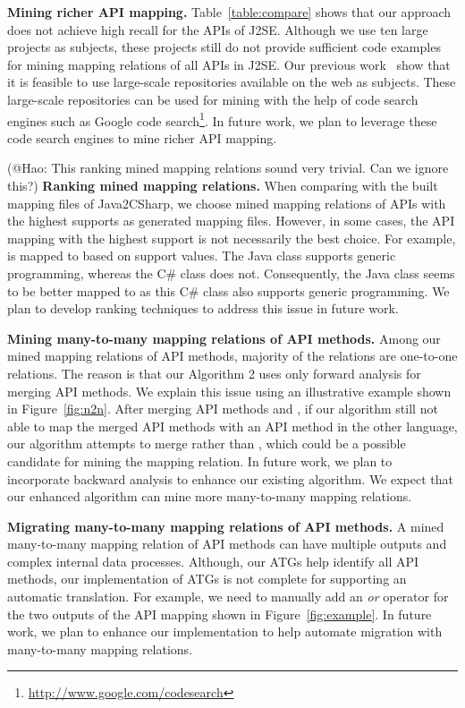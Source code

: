 \textbf{Mining richer API mapping.} Table~\ref{table:compare} shows
that our approach does not achieve high recall for the APIs of J2SE. Although
we use ten large projects as subjects, these projects still do not provide
sufficient code examples for mining mapping relations of all APIs in J2SE.
Our previous work~\cite{thummalapenta07parseweb,thummalapentaase08spotweb} show
that it is feasible to use large-scale repositories available on the web as subjects.
These large-scale repositories can be used for mining with the help of code search engines such
as Google code search\footnote{\url{http://www.google.com/codesearch}}. In future
work, we plan to leverage these code search engines to mine richer API mapping.

(@Hao: This ranking mined mapping relations sound very trivial. Can we ignore this?)
\textbf{Ranking mined mapping relations.} When comparing with the
built mapping files of Java2CSharp, we choose mined mapping
relations of APIs with the highest supports as generated mapping
files. However, in some cases, the API mapping with the highest
support is not necessarily the best choice. For example,
 is mapped to
 based on support values. The
Java class supports generic programming, whereas the C\# class does
not. Consequently, the Java class seems to be better mapped to
 as this C\# class also
supports generic programming. We plan to develop ranking techniques
to address this issue in future work.

\textbf{Mining many-to-many mapping relations of API methods.}
Among our mined mapping relations of API methods, majority of
the relations are one-to-one relations. The reason is that our Algorithm 2
uses only forward analysis for merging API methods. We explain this
issue using an illustrative example shown in Figure~\ref{fig:n2n}.
After merging API methods  and ,
if our algorithm still not able to map the merged API methods with an API method in the
other language, our algorithm attempts to merge  rather than
, which could be a possible candidate for mining
the mapping relation. In future work, we plan to incorporate
backward analysis to enhance our existing algorithm. We expect
that our enhanced algorithm can mine more many-to-many mapping relations.

\textbf{Migrating many-to-many mapping relations of API methods.} 
A mined many-to-many mapping relation of API methods can have multiple outputs
and complex internal data processes. Although, our ATGs 
help identify all API methods, our implementation of ATGs is not complete
for supporting an automatic translation. For example, we need to manually add an
\emph{or} operator for the two outputs of the API mapping shown in
Figure~\ref{fig:example}. In future work, we plan to enhance our implementation to help
automate migration with many-to-many mapping relations.

